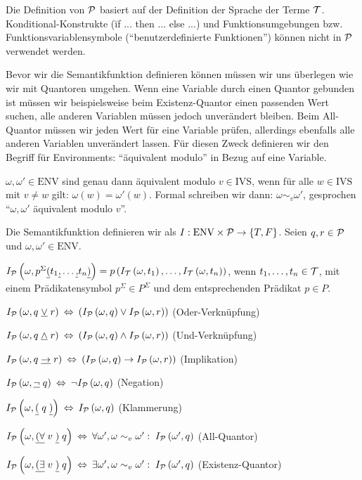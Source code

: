 Die Definition von $\mathcal{P}$ basiert auf der Definition der Sprache der Terme $\mathcal{T}$.
Konditional-Konstrukte (\u{if ... then ... else ...}) und Funktionsumgebungen
bzw. Funktionsvariablensymbole (``benutzerdefinierte Funktionen'') können nicht in $\mathcal{P}$ verwendet werden.

Bevor wir die Semantikfunktion definieren können müssen wir uns überlegen wie
wir mit Quantoren umgehen. Wenn eine Variable durch einen Quantor gebunden ist
müssen wir beispielsweise beim Existenz-Quantor einen passenden Wert suchen,
alle anderen Variablen müssen jedoch unverändert bleiben. Beim All-Quantor
müssen wir jeden Wert für eine Variable prüfen, allerdings ebenfalls alle anderen Variablen
unverändert lassen. Für diesen Zweck definieren wir den Begriff für Environments:
``äquivalent modulo'' in Bezug auf eine Variable.
\begin{defn}
$\omega,\omega' \in \text{ENV}$ sind genau dann äquivalent modulo $v \in \text{IVS}$,
wenn für alle $w \in \text{IVS}$ mit $v \neq w$ gilt: $\omega(w)=\omega'(w)$.
Formal schreiben wir dann: $\omega \sim_{v} \omega'$, gesprochen ``$\omega,\omega'$ äquivalent modulo $v$''.
\end{defn}

\begin{defn}
Die Semantikfunktion definieren wir als $I: \text{ENV}\times\mathcal{P}\to\left\{T,F\right\}$.
Seien $q,r \in \mathcal{P}$ und $\omega,\omega' \in \text{ENV}$.
\begin{\whichenum}
\item
$I_{\mathcal{P}}\left(\omega,p^{\Sigma}\text{\underline{(}}t_1\text{\underline{,}}\ldots\text{\underline{,}}t_n\text{\underline{)}}\right) = p\left(I_{\mathcal{T}}\left(\omega,t_1\right),\ldots,I_{\mathcal{T}}\left(\omega,t_n\right)\right)$, wenn $t_1,\ldots,t_n \in \mathcal{T}$,
mit einem Prädikatensymbol $p^{\Sigma} \in P^{\Sigma}$ und dem entsprechenden Prädikat $p \in P$.
\item $I_{\mathcal{P}}\left(\omega,q\;\underline{\vee}\;r\right) \:\Leftrightarrow\: \left(I_{\mathcal{P}}\left(\omega,q\right) \vee I_{\mathcal{P}}\left(\omega,r\right)\right)$ (Oder-Verknüpfung)
\item $I_{\mathcal{P}}\left(\omega,q\;\underline{\wedge}\;r\right) \:\Leftrightarrow\: \left(I_{\mathcal{P}}\left(\omega,q\right) \wedge I_{\mathcal{P}}\left(\omega,r\right)\right)$ (Und-Verknüpfung)
\item $I_{\mathcal{P}}\left(\omega,q\;\underline{\to}\;r\right) \:\Leftrightarrow\: \left(I_{\mathcal{P}}\left(\omega,q\right) \to I_{\mathcal{P}}\left(\omega,r\right)\right)$ (Implikation)
\item $I_{\mathcal{P}}\left(\omega,\underline{\text{$\neg$}}\;q\right) \:\Leftrightarrow\: \text{$\neg$} I_{\mathcal{P}}\left(\omega,q\right)$ (Negation)
\item $I_{\mathcal{P}}\left(\omega,\underline{(}\;q\;\underline{)}\right) \:\Leftrightarrow\: I_{\mathcal{P}}\left(\omega,q\right)$ (Klammerung)
\item $I_{\mathcal{P}}\left(\omega,\underline{(\text{$\forall$}}\;v\;\underline{)}\;q\right) \:\Leftrightarrow\: \text{$\forall$} \omega', \omega \sim_v \omega': \; I_{\mathcal{P}}\left(\omega',q\right)$ (All-Quantor)
\item $I_{\mathcal{P}}\left(\omega,\underline{(\text{$\exists$}}\;v\;\underline{)}\;q\right) \:\Leftrightarrow\: \text{$\exists$} \omega', \omega \sim_v \omega': \; I_{\mathcal{P}}\left(\omega',q\right)$ (Existenz-Quantor)
\end{\whichenum}
\end{defn}

